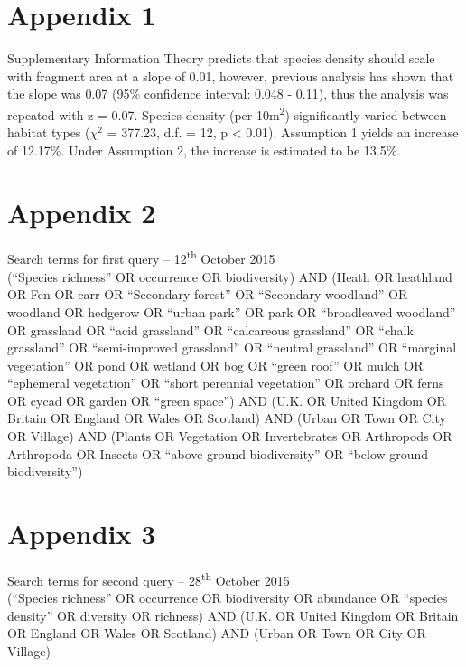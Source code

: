 \ifappendixStyle %
\else
\section*{Appendix 1}
\fi

Supplementary Information
Theory predicts that species density should scale with fragment area at a slope of 0.01, however, previous analysis has shown that the slope was 0.07 (95\% confidence interval: 0.048 - 0.11), thus the analysis was repeated with z = 0.07.  Species density (per 10m\textsuperscript{2}) significantly varied between habitat types ($\chi^2$ = 377.23, d.f. = 12, p < 0.01).  Assumption 1 yields an increase of 12.17\%. Under Assumption 2, the increase is estimated to be 13.5\%.

\ifappendixStyle %
\else
\section*{Appendix 2}
\fi
Search terms for first query -- 12\textsuperscript{th} October 2015
\\ \newline
(``Species richness'' OR occurrence OR biodiversity) AND (Heath OR heathland OR Fen OR carr OR ``Secondary forest'' OR ``Secondary woodland'' OR woodland OR hedgerow OR ``urban park'' OR park OR ``broadleaved woodland'' OR grassland OR ``acid grassland'' OR ``calcareous grassland'' OR ``chalk grassland'' OR ``semi-improved grassland'' OR ``neutral grassland'' OR ``marginal vegetation'' OR pond OR wetland OR bog OR ``green roof'' OR mulch OR ``ephemeral vegetation'' OR ``short perennial vegetation'' OR orchard OR ferns OR cycad OR garden OR ``green space'') AND (U.K. OR United Kingdom OR Britain OR England OR Wales OR Scotland) AND (Urban OR Town OR City OR Village) AND (Plants OR Vegetation OR Invertebrates OR Arthropods OR Arthropoda OR Insects OR ``above-ground biodiversity'' OR ``below-ground biodiversity'')

\ifappendixStyle %
\else
\section*{Appendix 3}
\fi
Search terms for second query -- 28\textsuperscript{th} October 2015
\\ \newline
(``Species richness'' OR occurrence OR biodiversity OR abundance OR ``species density'' OR diversity OR richness) AND (U.K. OR United Kingdom OR Britain OR England OR Wales OR Scotland) AND (Urban OR Town OR City OR Village)
